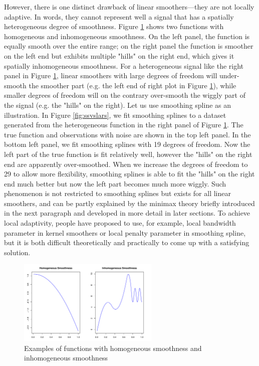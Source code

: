 \documentclass[a4paper]{article}
\begin{document}
However, there is one distinct drawback of linear smoothers---they are not locally adaptive. In words, they cannot represent well a signal that has a spatially heterogeneous degree of smoothness. Figure \ref{fig:homo} shows two functions with homogeneous and inhomogeneous smoothness. On the left panel, the function is equally smooth over the entire range; on the right panel the function is smoother on the left end but exhibits multiple "hills" on the right end, which gives it spatially inhomogeneous smoothness. For a heterogeneous signal like the right panel in Figure \ref{fig:homo}, linear smoothers with large degrees of freedom will under-smooth the smoother part (e.g. the left end of right plot in Figure \ref{fig:homo}), while smaller degrees of freedom will on the contrary over-smooth the wiggly part of the signal (e.g. the "hills" on the right). Let us use smoothing spline as an illustration. In Figure \ref{fig:ssvslars}, we fit smoothing splines to a dataset generated from the heterogeneous function in the right panel of Figure \ref{fig:homo}. The true function and observations with noise are shown in the top left panel. In the bottom left panel, we fit smoothing splines with 19 degrees of freedom. Now the left part of the true function is fit relatively well, however the "hills" on the right end are apparently over-smoothed. When we increase the degrees of freedom to 29 to allow more flexibility, smoothing splines is able to fit the "hills" on the right end much better but now the left part becomes much more wiggly. Such phenomenon is not restricted to smoothing splines but exists for all linear smoothers, and can be partly explained by the minimax theory briefly introduced in the next paragraph and developed in more detail in later sections. To achieve local adaptivity, people have proposed to use, for example, local bandwidth parameter in kernel smoothers or local penalty parameter in smoothing spline, but it is both difficult theoretically and practically to come up with a satisfying solution.

\begin{figure}[t!]
\centering
\includegraphics[width = 0.6\textwidth]{Figures/homo.pdf}
\caption{Examples of functions with homogeneous smoothness and inhomogeneous smoothness}
\label{fig:homo}
\end{figure}
\end{document}
